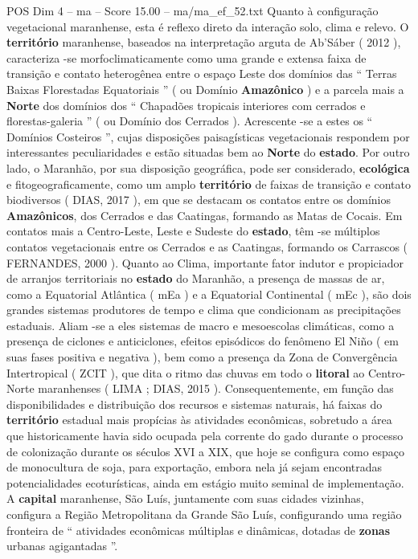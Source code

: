\begin{textsample}{POS Dim 4 – ma – Score 15.00 – ma/ma\_ef\_52.txt}
Quanto à configuração vegetacional maranhense, esta é reflexo direto da interação solo, clima e relevo.
O \textbf{território} maranhense, baseados na interpretação arguta de Ab’Sáber ( 2012 ), caracteriza -se morfoclimaticamente como uma grande e extensa faixa de transição e contato heterogênea entre o espaço Leste dos domínios das “ Terras Baixas Florestadas Equatoriais ” ( ou Domínio \textbf{Amazônico} ) e a parcela mais a \textbf{Norte} dos domínios dos “ Chapadões tropicais interiores com cerrados e florestas-galeria ” ( ou Domínio dos Cerrados ).
Acrescente -se a estes os “ Domínios Costeiros ”, cujas disposições paisagísticas vegetacionais respondem por interessantes peculiaridades e estão situadas bem ao \textbf{Norte} do \textbf{estado}.
Por outro lado, o Maranhão, por sua disposição geográfica, pode ser considerado, \textbf{ecológica} e fitogeograficamente, como um amplo \textbf{território} de faixas de transição e contato biodiversos ( DIAS, 2017 ), em que se destacam os contatos entre os domínios \textbf{Amazônicos}, dos Cerrados e das Caatingas, formando as Matas de Cocais.
Em contatos mais a Centro-Leste, Leste e Sudeste do \textbf{estado}, têm -se múltiplos contatos vegetacionais entre os Cerrados e as Caatingas, formando os Carrascos ( FERNANDES, 2000 ).
Quanto ao Clima, importante fator indutor e propiciador de arranjos territoriais no \textbf{estado} do Maranhão, a presença de massas de ar, como a Equatorial Atlântica ( mEa ) e a Equatorial Continental ( mEc ), são dois grandes sistemas produtores de tempo e clima que condicionam as precipitações estaduais.
Aliam -se a eles sistemas de macro e mesoescolas climáticas, como a presença de ciclones e anticiclones, efeitos episódicos do fenômeno El Niño ( em suas fases positiva e negativa ), bem como a presença da Zona de Convergência Intertropical ( ZCIT ), que dita o ritmo das chuvas em todo o \textbf{litoral} ao Centro-Norte maranhenses ( LIMA ; DIAS, 2015 ).
Consequentemente, em função das disponibilidades e distribuição dos recursos e sistemas naturais, há faixas do \textbf{território} estadual mais propícias às atividades econômicas, sobretudo a área que historicamente havia sido ocupada pela corrente do gado durante o processo de colonização durante os séculos XVI a XIX, que hoje se configura como espaço de monocultura de soja, para exportação, embora nela já sejam encontradas potencialidades ecoturísticas, ainda em estágio muito seminal de implementação.
A \textbf{capital} maranhense, São Luís, juntamente com suas cidades vizinhas, configura a Região Metropolitana da Grande São Luís, configurando uma região fronteira de “ atividades econômicas múltiplas e dinâmicas, dotadas de \textbf{zonas} urbanas agigantadas ”.

\end{textsample}
